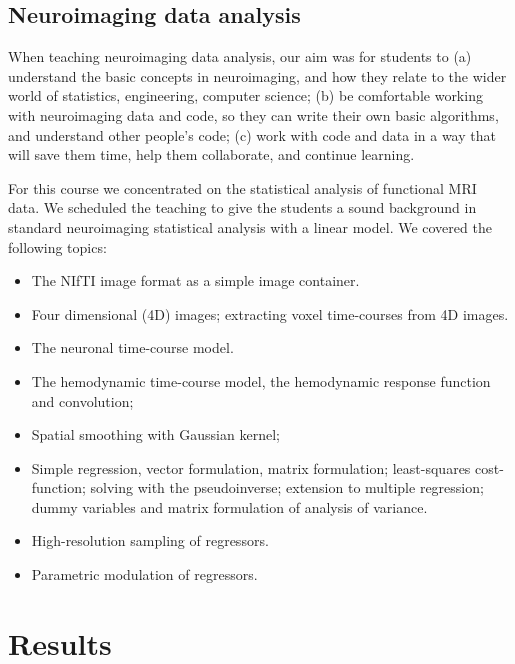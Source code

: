 \subsection{Neuroimaging data analysis}\label{analysis}

When teaching neuroimaging data analysis, our aim was for students to
(a) understand the basic concepts in neuroimaging,
and how they relate to the wider world of statistics, engineering, computer science;
(b) be comfortable working with neuroimaging data and code, so they can write
their own basic algorithms, and understand other people's code;
(c) work with code and data in a way that will save them time, help them collaborate,
and continue learning.%

For this course we concentrated on the statistical analysis of functional MRI
data.  We scheduled the teaching to give the students a sound background in
standard neuroimaging statistical analysis with a linear model.  We covered
the following topics:

\begin{itemize}

\item The NIfTI image format as a simple image container.
\item Four dimensional (4D) images; extracting voxel time-courses from 4D
    images.
\item The neuronal time-course model.
\item The hemodynamic time-course model, the hemodynamic response function and
    convolution;
\item Spatial smoothing with Gaussian kernel;
\item Simple regression, vector formulation, matrix formulation; least-squares
    cost-function; solving with the pseudoinverse; extension to multiple
        regression; dummy variables and matrix formulation of analysis of
        variance.
\item High-resolution sampling of regressors.
\item Parametric modulation of regressors.

\end{itemize}

\section{Results}\label{results}

